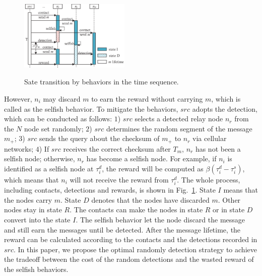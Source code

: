 \begin{figure}
  \centering
  {\includegraphics[width=0.47\textwidth]{fig/schedule.eps}}
     \caption{Sate transition by behaviors in the time sequence.}
     \label{fig:schedule}
\end{figure}
However, $n_{i}$ may discard $m$
to earn the reward without carrying $m$,
which is called as the selfish behavior.
To mitigate the behaviors,
$src$ adopts the detection,
which can be conducted as follows:
$1$) $src$ selects a detected relay node $n_{r}$
from the $N$ node set randomly;
$2$) $src$ determines the random segment of the message $m_{+}$;
$3$) $src$ sends the query about the checksum of $m_{+}$
to $n_{r}$ via cellular networks;
$4$) If $src$ receives the correct checksum after $T_{m}$,
$n_{r}$ has not been a selfish node;
otherwise, $n_{r}$ has become a selfish node.
For example, if $n_{i}$ is identified 
as a selfish node at $\tau_{i}^{d}$,
the reward will be computed as $\beta(\tau_{i}^{d} - \tau_{i}^{s})$,
which means that $n_{i}$ will not receive the reward 
from $\tau_{i}^{d}$.
The whole process,
including contacts, detections and rewards,
is shown in Fig.~\ref{fig:schedule}.
State $I$ means that the nodes carry $m$.
State $D$ denotes that the nodes have discarded $m$.
Other nodes stay in state $R$.
The contacts can make the nodes in state $R$ or in state $D$
convert into the state $I$.
The selfish behavior let the node discard the message
and still earn the messages until be detected.
After the message lifetime,
the reward can be calculated according to
the contacts and the detections recorded in $src$.
In this paper, we propose the optimal randomly detection strategy
to achieve the tradeoff between
the cost of the random detections and
the wasted reward of the selfish behaviors.

